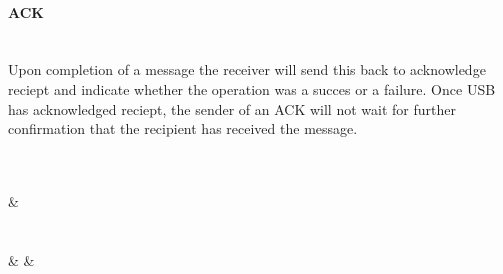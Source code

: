 \documentclass[10pt]{article}
\begin{document}
	\paragraph{ACK} \mbox{}\\
	Upon completion of a message the receiver will send this back to acknowledge reciept and indicate whether the operation was a succes or a failure. Once USB has acknowledged reciept, the sender of an ACK will not wait for further confirmation that the recipient has received the message. \\
	\\
	\begin{bytefield}[bitwidth=1.7em]{32}
	 \\
	 &
	 \\
	 \\
	 \\
	 &
	 &
	 \\
	\\
	\end{bytefield}\\
\end{document}
